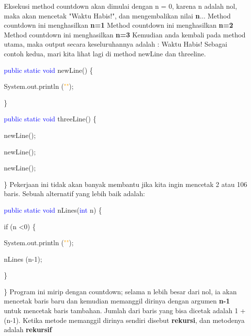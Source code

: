Eksekusi method countdown akan dimulai dengan n = 0, karena n adalah nol, maka akan mencetak "Waktu Habis!", dan mengembalikan nilai \textbf{n}...
\newline
\newline
Method countdown ini menghasilkan \textbf{n=1}
\newline
\newline
Method countdown ini menghasilkan \textbf{n=2}
\newline
\newline
Method countdown ini menghasilkan \textbf{n=3}
\newline
\newline
Kemudian anda kembali pada method utama, maka output secara keseluruhannya adalah :
\newline
Waktu Habis!
\newline
Sebagai contoh kedua, mari kita lihat lagi di method newLine dan
threeline.
\par
\textcolor{blue}{public static void} newLine() \{
\par
	System.out.println (\textcolor{orange}{""});
	\par
\}
\newline
	\par
\textcolor{blue}{public static void} threeLine() \{
		\par
	newLine(); 
		\par
	newLine(); 
		\par
	newLine();
		\par
\}
\newline
\newline
Pekerjaan ini tidak akan banyak membantu jika kita ingin mencetak 2 atau 106 baris. Sebuah alternatif yang lebih baik adalah:
\par
\textcolor{blue}{public static void} nLines(\textcolor{blue}{int} n) \{
\par
	if (n \textless 0) \{
	\par
		System.out.println (\textcolor{orange}{""});
		\par
		nLines (n-1);
		\par
	\}
	\par
\}
\newline
\newline
Program ini mirip dengan countdown; selama n lebih besar dari nol, ia akan mencetak baris baru dan kemudian memanggil dirinya dengan argumen \textbf{n-1} untuk mencetak baris tambahan. Jumlah dari baris yang bisa dicetak adalah 1 + (n-1).
\newline
\newline
Ketika metode memanggil dirinya sendiri disebut \textbf{rekursi}, dan metodenya adalah \textbf{rekursif}


